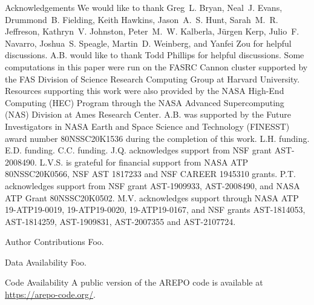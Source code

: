 \documentclass{natureprintstyle}
\begin{document}



\begin{addendum}
  
\item [Acknowledgements] We would like to thank Greg~L. Bryan, Neal~J. Evans,
Drummond~B. Fielding, Keith Hawkins, Jason~A.~S. Hunt, Sarah~M.~R. Jeffreson,
Kathryn~V. Johnston, Peter~M.~W. Kalberla, Jürgen Kerp, Julio~F. Navarro,
Joshua~S. Speagle, Martin~D. Weinberg, and Yanfei Zou for helpful discussions.
A.B. would like to thank Todd Phillips for helpful discussions. Some
computations in this paper were run on the FASRC Cannon cluster supported by
the FAS Division of Science Research Computing Group at Harvard University.
Resources supporting this work were also provided by the NASA High-End
Computing (HEC) Program through the NASA Advanced Supercomputing (NAS)
Division at Ames Research Center. A.B. was supported by the Future
Investigators in NASA Earth and Space Science and Technology (FINESST) award
number 80NSSC20K1536 during the completion of this work. L.H. funding. E.D.
funding. C.C. funding. J.Q. acknowledges support from NSF grant
AST-2008490. L.V.S. is grateful for financial support from NASA ATP
80NSSC20K0566, NSF AST 1817233 and NSF CAREER 1945310
grants. P.T. acknowledges support from NSF grant
AST-1909933, AST-2008490, and NASA ATP Grant 80NSSC20K0502. M.V. acknowledges
support through NASA ATP 19-ATP19-0019, 19-ATP19-0020, 19-ATP19-0167, and NSF
grants AST-1814053, AST-1814259, AST-1909831, AST-2007355 and AST-2107724.

\item[Author Contributions] Foo.

  \item[Data Availability] Foo.
    
  \item[Code Availability] A public version of the AREPO code is available at
  \url{https://arepo-code.org/}.
    
\end{addendum}



\FloatBarrier
\clearpage

\setcounter{page}{1}
\setcounter{figure}{0}
\setcounter{table}{0}
\renewcommand{\figurename}{Extended Data Figure}
\renewcommand{\thetable}{Extended Data \arabic{table}}
\end{document}
